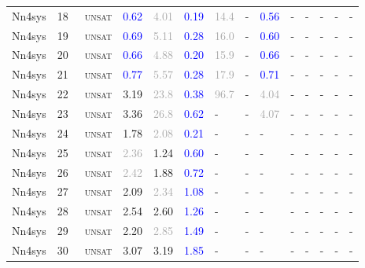 \begin{center}
{\begin{longtable}{@{}llllllllllllll@{}}
Nn4sys & 18 & ~\textsc{unsat} & \textcolor{blue}{0.62} & \textcolor{darkgray}{4.01} & \textcolor{blue}{0.19} & \textcolor{darkgray}{14.4} & - & \textcolor{blue}{0.56} & - & - & - & - & - \\
Nn4sys & 19 & ~\textsc{unsat} & \textcolor{blue}{0.69} & \textcolor{darkgray}{5.11} & \textcolor{blue}{0.28} & \textcolor{darkgray}{16.0} & - & \textcolor{blue}{0.60} & - & - & - & - & - \\
Nn4sys & 20 & ~\textsc{unsat} & \textcolor{blue}{0.66} & \textcolor{darkgray}{4.88} & \textcolor{blue}{0.20} & \textcolor{darkgray}{15.9} & - & \textcolor{blue}{0.66} & - & - & - & - & - \\
Nn4sys & 21 & ~\textsc{unsat} & \textcolor{blue}{0.77} & \textcolor{darkgray}{5.57} & \textcolor{blue}{0.28} & \textcolor{darkgray}{17.9} & - & \textcolor{blue}{0.71} & - & - & - & - & - \\
Nn4sys & 22 & ~\textsc{unsat} & \textcolor{second}{3.19} & \textcolor{darkgray}{23.8} & \textcolor{blue}{0.38} & \textcolor{darkgray}{96.7} & - & \textcolor{darkgray}{4.04} & - & - & - & - & - \\
Nn4sys & 23 & ~\textsc{unsat} & \textcolor{second}{3.36} & \textcolor{darkgray}{26.8} & \textcolor{blue}{0.62} & - & - & \textcolor{darkgray}{4.07} & - & - & - & - & - \\
Nn4sys & 24 & ~\textsc{unsat} & \textcolor{second}{1.78} & \textcolor{darkgray}{2.08} & \textcolor{blue}{0.21} & - & - & - & - & - & - & - & - \\
Nn4sys & 25 & ~\textsc{unsat} & \textcolor{darkgray}{2.36} & \textcolor{second}{1.24} & \textcolor{blue}{0.60} & - & - & - & - & - & - & - & - \\
Nn4sys & 26 & ~\textsc{unsat} & \textcolor{darkgray}{2.42} & \textcolor{second}{1.88} & \textcolor{blue}{0.72} & - & - & - & - & - & - & - & - \\
Nn4sys & 27 & ~\textsc{unsat} & \textcolor{second}{2.09} & \textcolor{darkgray}{2.34} & \textcolor{blue}{1.08} & - & - & - & - & - & - & - & - \\
Nn4sys & 28 & ~\textsc{unsat} & \textcolor{second}{2.54} & \textcolor{second}{2.60} & \textcolor{blue}{1.26} & - & - & - & - & - & - & - & - \\
Nn4sys & 29 & ~\textsc{unsat} & \textcolor{second}{2.20} & \textcolor{darkgray}{2.85} & \textcolor{blue}{1.49} & - & - & - & - & - & - & - & - \\
Nn4sys & 30 & ~\textsc{unsat} & \textcolor{second}{3.07} & \textcolor{second}{3.19} & \textcolor{blue}{1.85} & - & - & - & - & - & - & - & - \\

\end{longtable}}
\end{center}
